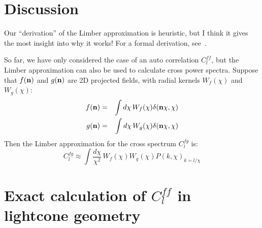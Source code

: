 \documentclass[aps,prd,superscriptaddress,groupedaddress,nofootinbib,nobibnotes]{revtex4}
\newcommand{\be}{\begin{equation}}
\newcommand{\ee}{\end{equation}}
\newcommand{\ba}{\begin{eqnarray}}
\newcommand{\ea}{\end{eqnarray}}
\def\n{{\bf n}}
\begin{document}
\section{Discussion}

Our ``derivation'' of the Limber approximation is heuristic, but I think it gives the most insight into
why it works!  For a formal derivation, see~\cite{LoVerde:2008re}.

So far, we have only considered the case of an auto correlation $C_l^{ff}$, but the Limber approximation
can also be used to calculate cross power spectra.  Suppose that $f(\n)$ and $g(\n)$ are 2D projected fields,
with radial kernels $W_f(\chi)$ and $W_g(\chi)$:
\ba
f(\n) &=& \int d\chi \, W_f(\chi) \delta(\n\chi, \chi) \\
g(\n) &=& \int d\chi \, W_g(\chi) \delta(\n\chi, \chi)
\ea
Then the Limber approximation for the cross spectrum $C_l^{fg}$ is:
\be
C_l^{fg} \approx \int \frac{d\chi}{\chi^2} \, W_f(\chi) W_g(\chi) P(k,\chi)_{k=l/\chi}
\ee


%




\appendix

\section{Exact calculation of $C_l^{ff}$ in lightcone geometry}
\label{app:clff_lightcone}
\end{document}

